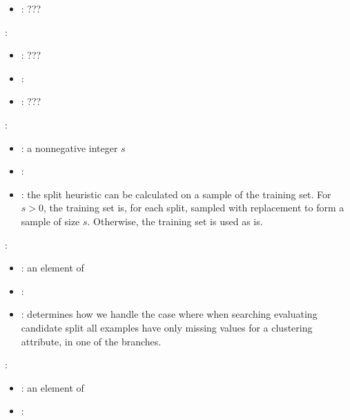 \begin{itemize}
{\begin{itemize}
                \item \optionDescrption{}: ???
           \end{itemize}
    \item {}:
           \begin{itemize}
                \item \optionPossibleValues{}: ???
                \item \optionDefaultValue{}: 
                \item \optionDescrption{}: ???
           \end{itemize}
    }
    \item {}:
           \begin{itemize}
                \item \optionPossibleValues{}: a nonnegative integer $s$
                \item \optionDefaultValue{}: 
                \item \optionDescrption{}: the split heuristic can be calculated on a sample of the training set. For $s > 0$, the training set is, for each split, sampled with replacement to form a sample of size $s$. Otherwise, the training set is used as is. 
           \end{itemize}
    \item {}:
           \begin{itemize}
                \item \optionPossibleValues{}: an element of 
                \item \optionDefaultValue{}: 
                \item \optionDescrption{}: determines how we handle the case where when searching evaluating candidate split all examples have only missing values for a clustering attribute, in one of the branches.
           \end{itemize}
    \item {}:
           \begin{itemize}
                \item \optionPossibleValues{}: an element of 
                \item \optionDefaultValue{}: 

\end{itemize}
\end{itemize}
